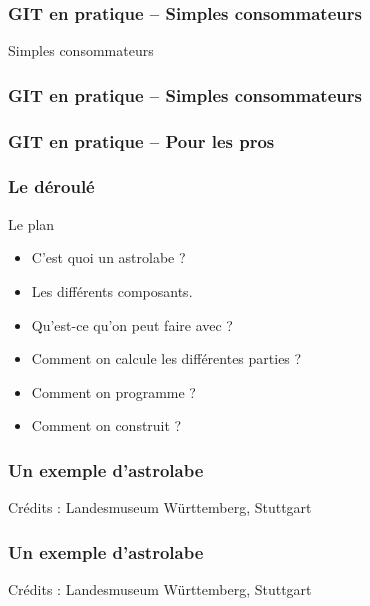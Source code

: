\documentclass{beamer}
\begin{document}
\begin{frame}\frametitle{GIT en pratique -- Simples consommateurs }
Simples consommateurs
\begin{center}
\hglue -1cm 
\end{center}

\end{frame}

\begin{frame}\frametitle{GIT en pratique -- Simples consommateurs}
\begin{center}
\hglue -1cm 
\end{center}

   \end{frame}
   
   \begin{frame}\frametitle{GIT en pratique -- Pour les pros}
\begin{center}
\hglue -2cm 
\end{center}

   \end{frame}
   
   
   


\begin{frame}\frametitle{Le déroulé}
\begin{block}{Le plan}
\begin{itemize}
\item C'est quoi un astrolabe ?
\item Les différents composants. 
\item Qu'est-ce qu'on peut faire avec ? 
\item Comment on calcule les différentes parties ? 
\item Comment on programme ? 
\item Comment on construit ?

\end{itemize}
\end{block}

   \end{frame}
   
\begin{frame}\frametitle{Un exemple d'astrolabe}
\begin{center}
\end{center}
{\hfill Crédits : Landesmuseum Württemberg, Stuttgart}



   \end{frame}
   
   \begin{frame}\frametitle{Un exemple d'astrolabe}
\begin{center}
\end{center}
{\hfill Crédits : Landesmuseum Württemberg, Stuttgart}
   \end{frame}
   
\begin{frame}\frametitle{}

   \end{frame}
   
\begin{frame}\frametitle{}

   \end{frame}
 
\end{document}

